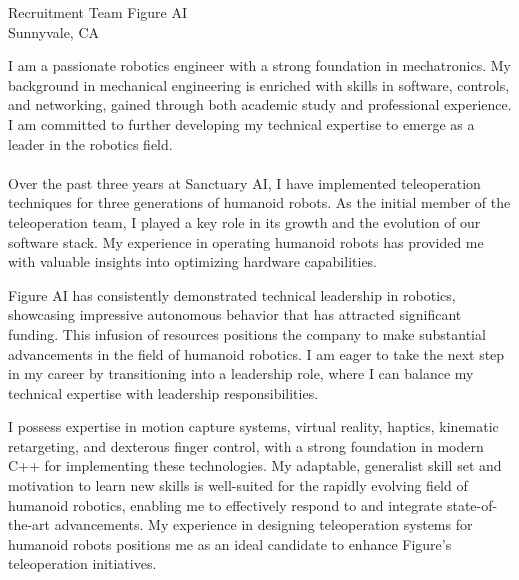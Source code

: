 \documentclass[11pt, a4paper]{awesome-cv}
\begin{document}


\recipient
  {Recruitment Team}
  {Figure AI\\Sunnyvale, CA}

\makelettertitle

\begin{cvletter}


I am a passionate robotics engineer with a strong foundation in mechatronics. 
My background in mechanical engineering is enriched with skills in software, controls, and networking, gained through both academic study and professional experience. 
I am committed to further developing my technical expertise to emerge as a leader in the robotics field.
\\\\Over the past three years at Sanctuary AI, I have implemented teleoperation techniques for three generations of humanoid robots. 
As the initial member of the teleoperation team, I played a key role in its growth and the evolution of our software stack.
My experience in operating humanoid robots has provided me with valuable insights into optimizing hardware capabilities.

Figure AI has consistently demonstrated technical leadership in robotics, showcasing impressive autonomous behavior that has attracted significant funding. 
This infusion of resources positions the company to make substantial advancements in the field of humanoid robotics. 
I am eager to take the next step in my career by transitioning into a leadership role, where I can balance my technical expertise with leadership responsibilities.

I possess expertise in motion capture systems, virtual reality, haptics, kinematic retargeting, and dexterous finger control, with a strong foundation in modern C++ for implementing these technologies. 
My adaptable, generalist skill set and motivation to learn new skills is well-suited for the rapidly evolving field of humanoid robotics, enabling me to effectively respond to and integrate state-of-the-art advancements.
My experience in designing teleoperation systems for humanoid robots positions me as an ideal candidate to enhance Figure's teleoperation initiatives. 

\end{cvletter}
\end{document}
